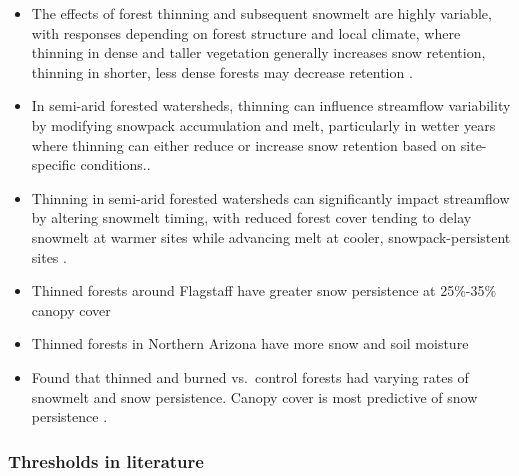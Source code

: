 \documentclass[
  number]{elsarticle}
\begin{document}
\begin{itemize}
\item
  The effects of forest thinning and subsequent snowmelt are highly
  variable, with responses depending on forest structure and local
  climate, where thinning in dense and taller vegetation generally
  increases snow retention, thinning in shorter, less dense forests may
  decrease retention \citep{lewis_prediction_2023}.
\item
  In semi-arid forested watersheds, thinning can influence streamflow
  variability by modifying snowpack accumulation and melt, particularly
  in wetter years where thinning can either reduce or increase snow
  retention based on site-specific
  conditions.\citep{broxton_subseasonal_2023}.
\item
  Thinning in semi-arid forested watersheds can significantly impact
  streamflow by altering snowmelt timing, with reduced forest cover
  tending to delay snowmelt at warmer sites while advancing melt at
  cooler, snowpack-persistent sites \citep{dwivedi_how_2024}.
\item
  Thinned forests around Flagstaff have greater snow persistence at
  25\%-35\% canopy cover \citep{belmonte_uav-based_2021}
\item
  Thinned forests in Northern Arizona have more snow and soil moisture
  \citep{odonnell_vegetation_2021}
\item
  Found that thinned and burned vs.~control forests had varying rates of
  snowmelt and snow persistence. Canopy cover is most predictive of snow
  persistence \citep{donager_integrating_2021}.
\end{itemize}

\subsubsection{Thresholds in literature}\label{thresholds-in-literature}
\end{document}
